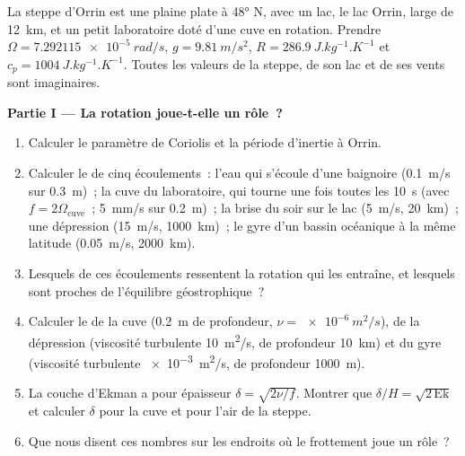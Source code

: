 \begin{problem}
\label{pb:b3:gfd-foundations:1}
La steppe d'Orrin est une plaine plate à \ang{48} N, avec un lac, le lac Orrin,
large de \qty{12}{km}, et un petit laboratoire doté d'une cuve en rotation. Prendre
$\Omega = \qty{7.292115e-5}{rad/s}$, $g = \qty{9.81}{m/s^2}$, $R =
\qty{286.9}{J.kg^{-1}.K^{-1}}$ et $c_p = \qty{1004}{J.kg^{-1}.K^{-1}}$.
Toutes les valeurs de la steppe, de son lac et de ses vents sont imaginaires.

\medskip\noindent\textbf{Partie I --- La rotation joue-t-elle un rôle~?}
\begin{enumerate}
\item Calculer le paramètre de Coriolis et la période d'inertie à Orrin.
\item Calculer le  de cinq écoulements~: l'eau qui s'écoule
  d'une baignoire (\qty{0.1}{m/s} sur \qty{0.3}{m})~; la cuve du laboratoire, qui
  tourne une fois toutes les \qty{10}{s} (avec $f = 2\Omega_{\text{cuve}}$~;
  \qty{5}{mm/s} sur \qty{0.2}{m})~; la brise du soir sur le lac (\qty{5}{m/s},
  \qty{20}{km})~; une dépression (\qty{15}{m/s}, \qty{1000}{km})~; le gyre
  d'un bassin océanique à la même latitude (\qty{0.05}{m/s}, \qty{2000}{km}).
\item Lesquels de ces écoulements ressentent la rotation qui les entraîne, et
  lesquels sont proches de l'équilibre géostrophique~?
\item Calculer le  de la cuve (\qty{0.2}{m} de profondeur, $\nu =
  \qty{e-6}{m^2/s}$), de la dépression (viscosité turbulente \qty{10}{m^2/s},
  de profondeur \qty{10}{km}) et du gyre (viscosité turbulente \qty{e-3}{m^2/s},
  de profondeur \qty{1000}{m}).
\item La couche d'Ekman a pour épaisseur $\delta = \sqrt{2\nu/f}$. Montrer que
  $\delta/H = \sqrt{2\,\mathrm{Ek}}$ et calculer $\delta$ pour la cuve et pour
  l'air de la steppe.
\item Que nous disent ces nombres sur les endroits où le frottement joue un rôle~?
\end{enumerate}


\end{problem}
